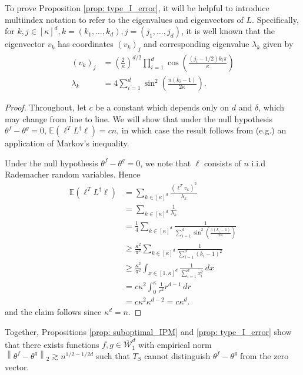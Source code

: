 \documentclass{article}
\newcommand{\norm}[1]{\left\lVert#1\right\rVert}
\newcommand{\1}{\mathbb{I}}
\newcommand{\Linv}{L^{\dagger}}
\newcommand{\Ebb}{\mathbb{E}}
\newcommand{\dx}{\,dx}
\newcommand{\dr}{\,dr}
\theoremstyle{alden}
\theoremstyle{aldenthm}
\theoremstyle{definition}
\theoremstyle{remark}
\begin{document}
To prove Proposition \ref{prop: type_I_error}, it will be helpful to introduce multiindex notation to refer to the eigenvalues and eigenvectors of $L$. Specifically, for $k,j \in [\kappa]^d, k = (k_1, \ldots, k_d), j = (j_1, \ldots, j_d)$, it is well known that the eigenvector $v_k$ has coordinates $(v_k)_j$ and corresponding eigenvalue $\lambda_k$ given by
\begin{align*}
(v_k)_j & = \left(\frac{2}{\kappa}\right)^{d/2} \prod_{i = 1}^{d} \cos\left(\frac{(j_i - 1/2) k_i \pi}{\kappa}\right) \\
\lambda_k & = 4 \sum_{i = 1}^{d} \sin^2\left(\frac{\pi(k_i - 1)}{2\kappa}\right).
\end{align*}
\begin{proof}
	Throughout, let $c$ be a constant which depends only on $d$ and $\delta$, which may change from line to line. We will show that under the null hypothesis $\theta^f - \theta^g = 0$, $\Ebb(\ell^T \Linv \ell) = c n$, in which case the result follows from (e.g.) an application of Markov's inequality.
	
	Under the null hypothesis $\theta^f - \theta^g = 0$, we note that $\ell$ consists of $n$ i.i.d Rademacher random variables. Hence
	\begin{align*}
	\Ebb(\ell^T \Linv \ell) & = \sum_{k \in [\kappa]^d} \frac{(\ell^T v_k)^2}{\lambda_k} \\
	& = \sum_{k \in [\kappa]^d} \frac{1}{\lambda_k} \\
	& = \frac{1}{4} \sum_{k \in [\kappa]^d} \frac{1}{\sum_{i = 1}^{d} \sin^2\left(\frac{\pi(k_i - 1)}{2\kappa}\right)} \\
	& \geq \frac{\kappa^2}{\pi^2} \sum_{k \in [\kappa]^d} \frac{1}{\sum_{i = 1}^{d} (k_i - 1)^2} \\
	& \geq \frac{\kappa^2}{\pi^2} \int_{x \in [1,\kappa]^d} \frac{1}{\sum_{i = 1}^d x_i^2} \dx \\
	& = c \kappa^2 \int_{0}^{\kappa} \frac{1}{r^2} r^{d - 1} \dr \\
	& = c \kappa^2 \kappa^{d - 2} = c \kappa^d. 
	\end{align*}
	and the claim follows since $\kappa^d = n$.
\end{proof}

Together, Propositions \ref{prop: suboptimal_IPM} and \ref{prop: type_I_error} show that there exists functions $f,g \in \overline{\mathcal{W}}_1^d$ with empirical norm $\norm{\theta^f - \theta^g}_2 \gtrsim n^{1/2 - 1/2d}$ such that $T_S$ cannot distinguish $\theta^f - \theta^g$ from the zero vector. 
\end{document}
